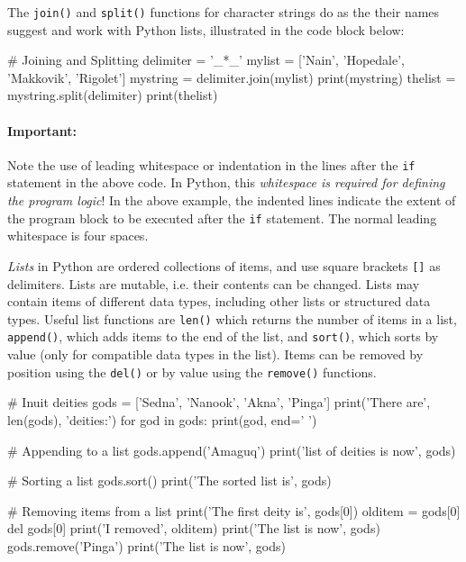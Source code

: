The \texttt{join()} and \texttt{split()} functions for character strings do as the their names suggest and work with Python lists, illustrated in the code block below:

\begin{samepage}
\begin{pythoncode}
# Joining and Splitting    
delimiter = '_*_'
mylist = ['Nain', 'Hopedale', 'Makkovik', 'Rigolet']
mystring = delimiter.join(mylist)
print(mystring)
thelist = mystring.split(delimiter)
print(thelist)
\end{pythoncode}
\end{samepage}

\begin{tcolorbox}[colback=alert]
\paragraph{Important:} Note the use of leading whitespace or indentation in the lines after the \texttt{if} statement in the above code. In Python, this \emph{whitespace is required for defining the program logic}! In the above example, the indented lines indicate the extent of the program block to be executed after the \texttt{if} statement. The normal leading whitespace is four spaces. 
\end{tcolorbox}

\emph{Lists} in Python are ordered collections of items, and use square brackets \texttt{[]} as delimiters. Lists are mutable, i.e. their contents can be changed. Lists may contain items of different data types, including other lists or structured data types. Useful list functions are \texttt{len()} which returns the number of items in a list, \texttt{append()}, which adds items to the end of the list, and \texttt{sort()}, which sorts by value (only for compatible data types in the list). Items can be removed by position using the \texttt{del()} or by value using the \texttt{remove()} functions.

\begin{samepage}
\begin{pythoncode}
# Inuit deities
gods = ['Sedna', 'Nanook', 'Akna', 'Pinga']
print('There are', len(gods), 'deities:')
for god in gods:
    print(god, end=' ')

# Appending to a list
gods.append('Amaguq')
print('\nThe list of deities is now', gods)

# Sorting a list
gods.sort()
print('The sorted list is', gods)

# Removing items from a list
print('The first deity is', gods[0])
olditem = gods[0]
del gods[0]
print('I removed', olditem)
print('The list is now', gods)
gods.remove('Pinga')
print('The list is now', gods)
\end{pythoncode}
\end{samepage}

